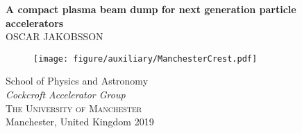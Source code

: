 {}	%
\thispagestyle{empty}
\begin{center}
	\textbf{\Huge A compact plasma beam dump for next generation particle accelerators} \\[1cm]
	{\large OSCAR JAKOBSSON}
	
	\vfill	
	\begin{figure}[H]
	\centering
	\texttt{[image: figure/auxiliary/ManchesterCrest.pdf]} \\	
	\end{figure}	\vspace{5mm}	
	
	School of Physics and Astronomy \\
	\textit{Cockcroft Accelerator Group}\\
	\textsc{The University of Manchester} \\
	Manchester, United Kingdom 2019 \\
\end{center}








